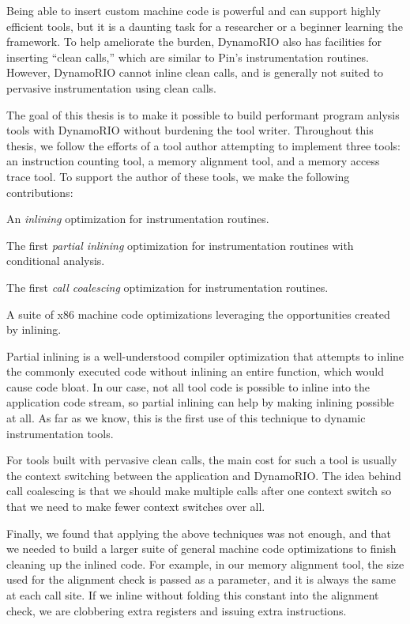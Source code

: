 Being able to insert custom machine code is powerful and can support highly
efficient tools, but it is a daunting task for a researcher or a beginner
learning the framework.  To help ameliorate the burden, DynamoRIO also has
facilities for inserting ``clean calls,'' which are similar to Pin's
instrumentation routines.  However, DynamoRIO cannot inline clean calls, and is
generally not suited to pervasive instrumentation using clean calls.

The goal of this thesis is to make it possible to build performant program
anlysis tools with DynamoRIO without burdening the tool writer.  Throughout
this thesis, we follow the efforts of a tool author attempting to implement
three tools: an instruction counting tool, a memory alignment tool, and a
memory access trace tool.  To support the author of these tools, we make the
following contributions:

\begin{packed_itemize}
\item An {\em inlining} optimization for instrumentation routines.
\item The first {\em partial inlining} optimization for instrumentation
routines with conditional analysis.
\item The first {\em call coalescing} optimization for instrumentation
routines.
\item A suite of x86 machine code optimizations leveraging the opportunities
created by inlining.
\end{packed_itemize}

Partial inlining is a well-understood compiler optimization that attempts to
inline the commonly executed code without inlining an entire function, which
would cause code bloat.  In our case, not all tool code is possible to inline
into the application code stream, so partial inlining can help by making
inlining possible at all.  As far as we know, this is the first use of this
technique to dynamic instrumentation tools.

For tools built with pervasive clean calls, the main cost for such a tool is
usually the context switching between the application and DynamoRIO.  The idea
behind call coalescing is that we should make multiple calls after one context
switch so that we need to make fewer context switches over all.

Finally, we found that applying the above techniques was not enough, and that
we needed to build a larger suite of general machine code optimizations to
finish cleaning up the inlined code.  For example, in our memory alignment
tool, the size used for the alignment check is passed as a parameter, and it is
always the same at each call site.  If we inline without folding this constant
into the alignment check, we are clobbering extra registers and issuing extra
instructions.

